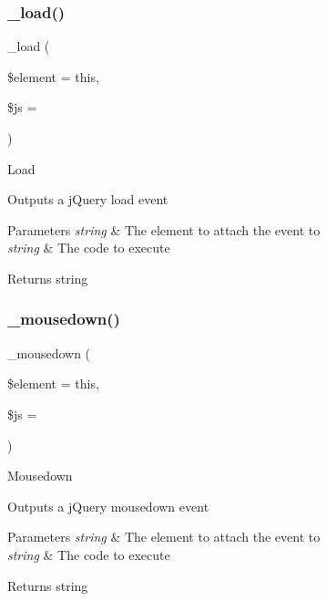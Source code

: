 \subsubsection{\texorpdfstring{\+\_\+load()}{\_load()}}
{\footnotesize\ttfamily \+\_\+load (\begin{DoxyParamCaption}\item[{}]{\$element = {\ttfamily \textquotesingle{}this\textquotesingle{}},  }\item[{}]{\$js = {\ttfamily \textquotesingle{}\textquotesingle{}} }\end{DoxyParamCaption})\hspace{0.3cm}{\ttfamily [protected]}}

Load

Outputs a j\+Query load event


\begin{DoxyParams}{Parameters}
{\em string} & The element to attach the event to \\
\hline
{\em string} & The code to execute \\
\hline
\end{DoxyParams}
\begin{DoxyReturn}{Returns}
string 
\end{DoxyReturn}
\mbox{\label{class_c_i___jquery_a95cb3f44c2413b0fbe51734b346f4d92}} 
\subsubsection{\texorpdfstring{\+\_\+mousedown()}{\_mousedown()}}
{\footnotesize\ttfamily \+\_\+mousedown (\begin{DoxyParamCaption}\item[{}]{\$element = {\ttfamily \textquotesingle{}this\textquotesingle{}},  }\item[{}]{\$js = {\ttfamily \textquotesingle{}\textquotesingle{}} }\end{DoxyParamCaption})\hspace{0.3cm}{\ttfamily [protected]}}

Mousedown

Outputs a j\+Query mousedown event


\begin{DoxyParams}{Parameters}
{\em string} & The element to attach the event to \\
\hline
{\em string} & The code to execute \\
\hline
\end{DoxyParams}
\begin{DoxyReturn}{Returns}
string 
\end{DoxyReturn}
\mbox{\label{class_c_i___jquery_a8a575b3b64cda3a24434e8fed1553124}} 
